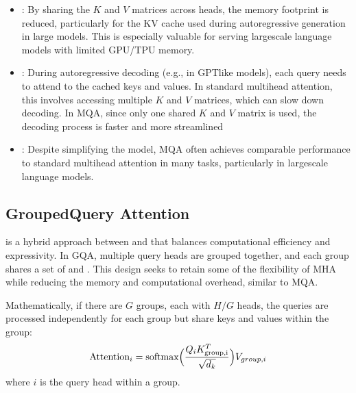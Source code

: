\documentclass[letterpaper,11pt,english]{sphinxmanual}
\begin{document}
\sphinxAtStartPar
{}
\begin{itemize}
\item {} 
\sphinxAtStartPar
{}: By sharing the \(K\) and \(V\)
matrices across heads, the memory footprint is reduced, particularly
for the KV cache used during autoregressive generation in large
models. This is especially valuable for serving large\sphinxhyphen{}scale language
models with limited GPU/TPU memory.

\item {} 
\sphinxAtStartPar
{}: During autoregressive decoding (e.g., in GPT\sphinxhyphen{}like
models), each query needs to attend to the cached keys and values. In
standard multi\sphinxhyphen{}head attention, this involves accessing multiple
\(K\) and \(V\) matrices, which can slow down decoding. In
MQA, since only one shared \(K\) and \(V\) matrix is used, the
decoding process is faster and more streamlined

\item {} 
\sphinxAtStartPar
{}: Despite simplifying the model, MQA
often achieves comparable performance to standard multi\sphinxhyphen{}head attention
in many tasks, particularly in large\sphinxhyphen{}scale language models.

\end{itemize}


\subsection{Grouped\sphinxhyphen{}Query Attention}
\label{\detokenize{pretraining:grouped-query-attention}}
\sphinxAtStartPar
{} is a hybrid approach between
 and  that
balances computational efficiency and expressivity. In GQA, multiple
query heads are grouped together, and each group shares a set of
 and . This design seeks to retain some of the
flexibility of MHA while reducing the memory and computational overhead,
similar to MQA.

\sphinxAtStartPar
Mathematically, if there are \(G\) groups, each with \(H / G\)
heads, the queries are processed independently for each group but share
keys and values within the group:
\begin{equation*}
\begin{split}\text{Attention}_i = \text{softmax} \Big({Q_i K^T_{\text{group,i}}\over \sqrt{d_k}}\Big) V_{group,i}\end{split}
\end{equation*}
\sphinxAtStartPar
where \(i\) is the query head within a group.
\end{document}
